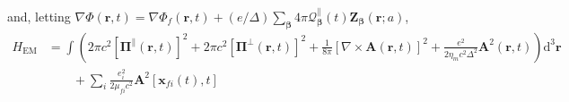 \documentclass{article}
\begin{document}
and, letting $\nabla\Phi(\mathbf{r},t) = \nabla\Phi_f(\mathbf{r},t) + (e/\Delta)\sum_{\bm{\beta}}4\pi\mathcal{Q}_{\bm{\beta}}^\parallel(t)\mathbf{Z}_{\bm{\beta}}(\mathbf{r};a)$,
\begin{equation}
\begin{split}
H_\mathrm{EM} &= \int\left(2\pi c^2\left[\bm{\Pi}^\parallel(\mathbf{r},t)\right]^2 + 2\pi c^2\left[\bm{\Pi}^\perp(\mathbf{r},t)\right]^2 +  \frac{1}{8\pi}\left[\nabla\times\mathbf{A}(\mathbf{r},t)\right]^2 + \frac{e^2}{2\eta_m c^2\Delta^2}\mathbf{A}^2(\mathbf{r},t)\right)\mathrm{d}^3\mathbf{r}\\
&\qquad+ \sum_i\frac{e_i^2}{2\mu_{fi}c^2}\mathbf{A}^2[\mathbf{x}_{fi}(t),t]\\

\end{split}
\end{equation}
\end{document}
